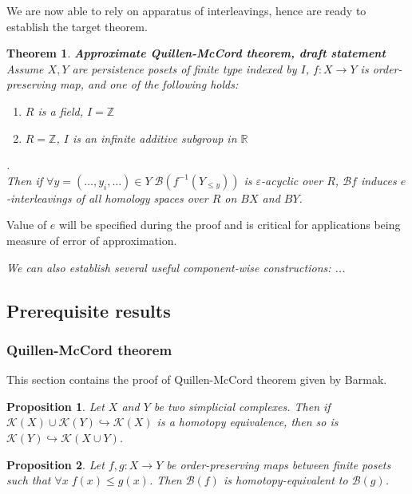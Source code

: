 \documentclass[a4paper, 12pt]{article}
\newtheorem{proposition}{Proposition}
\newtheorem{theorem}{Theorem}
\theoremstyle{definition}
\theoremstyle{remark}
\renewcommand{\leq}{\leqslant}
\begin{document}
We are now able to rely on apparatus of interleavings, hence are ready to establish the target theorem.\\

\begin{theorem} \textbf{Approximate Quillen-McCord theorem, draft statement}\\
  Assume $X, Y$ are persistence posets of finite type indexed by $I$, $f : X \to Y$ is order-preserving map, and one of the following holds:\\
  \begin{enumerate}
    \item $R$ is a field, $I = \mathbb{Z}$
    \item $R = \mathbb{Z}$, $I$ is an infinite additive subgroup in $\mathbb{R}$
  \end{enumerate}.\\

  Then if $\forall y=(\ldots,y_i,\ldots) \in Y\;\mathcal{B}(f^{-1}(Y_{\leqslant y}))$ is $\varepsilon$-acyclic over $R$, $\mathcal{B}f$ induces $e$-interleavings of all homology spaces over $R$ on $BX$ and $BY$.\\
\end{theorem}

Value of $e$ will be specified during the proof and is critical for applications being measure of error of approximation.

\textit{We can also establish several useful component-wise constructions: ...}

\subsection{Prerequisite results}

\subsubsection{Quillen-McCord theorem}

This section contains the proof of Quillen-McCord theorem given by Barmak.

\begin{proposition} {\cite[Proposition 2.1]{Bar11}}
  Let $X$ and $Y$ be two simplicial complexes. Then if $\mathcal{K}(X) \cup \mathcal{K}(Y) \hookrightarrow \mathcal{K}(X)$ is a homotopy equivalence, then so is $\mathcal{K}(Y) \hookrightarrow \mathcal{K}(X \cup Y)$.
\end{proposition}

\begin{proposition} {\cite[Proposition 2.2]{Bar11}}
  Let $f,g : X \to Y$ be order-preserving maps between finite posets such that $\forall x\;f(x) \leq g(x)$. Then $\mathcal{B}(f)$ is homotopy-equivalent to $\mathcal{B}(g)$.
\end{proposition}
\end{document}
